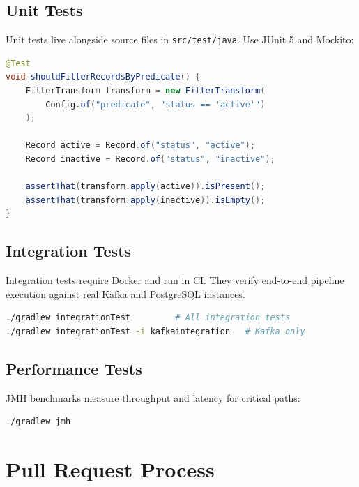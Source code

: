 \documentclass[
    language=english,
    doctype=manual,
    institution=none,
    titlestyle=book,
    oneside,
]{../../omnilatex}
\begin{document}
\section{Unit Tests}

Unit tests live alongside source files in \texttt{src/test/java}. Use
JUnit 5 and Mockito:

\begin{lstlisting}[language=java, caption={Example unit test.}]
@Test
void shouldFilterRecordsByPredicate() {
    FilterTransform transform = new FilterTransform(
        Config.of("predicate", "status == 'active'")
    );

    Record active = Record.of("status", "active");
    Record inactive = Record.of("status", "inactive");

    assertThat(transform.apply(active)).isPresent();
    assertThat(transform.apply(inactive)).isEmpty();
}
\end{lstlisting}

\section{Integration Tests}

Integration tests require Docker and run in CI. They verify end-to-end
pipeline execution against real Kafka and PostgreSQL instances.

\begin{lstlisting}[language=bash, caption={Run integration tests.}]
./gradlew integrationTest         # All integration tests
./gradlew integrationTest -i kafkaintegration   # Kafka only
\end{lstlisting}

\section{Performance Tests}

JMH benchmarks measure throughput and latency for critical paths:

\begin{lstlisting}[language=bash, caption={Run JMH benchmarks.}]
./gradlew jmh
\end{lstlisting}

\chapter{Pull Request Process}
\label{sec:pr-process}
\end{document}
